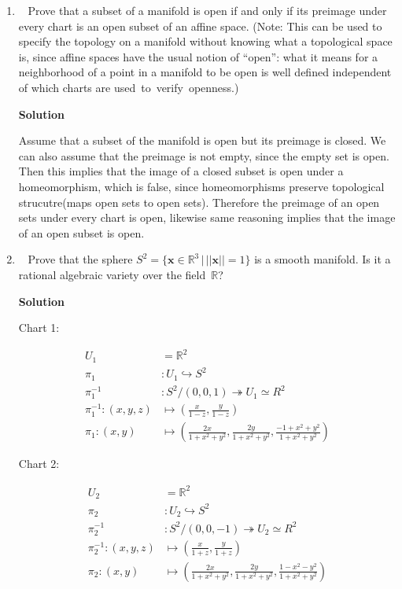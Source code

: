 \documentclass[11pt]{article}
\newcommand\score[1]{\marginpar{\vspace{-2ex}\color{blue}{#1/3}}\hspace{-1ex}}
\newcommand\0{\mathbf{0}}
\newcommand\RR{\mathbb{R}}
\newcommand\xx{\mathbf{x}}
\newcommand\<{\langle}
\renewcommand\>{\rangle}
\begin{document}
\begin{enumerate}

\item\ \score{}%
Prove that a subset of a manifold is open if and only if its preimage
under every chart is an open subset of an affine space.  (Note: This
can be used to specify the topology on a manifold without
knowing what a topological space is, since affine spaces have the
usual
notion of ``open'': what it means for a neighborhood of a point in a
manifold to be open is well defined independent of which charts are
used~to~verify~openness.)

\textbf{Solution}

Assume that a subset of the manifold is open but its preimage
is closed. We can also assume that the preimage is not empty, since the 
empty set is open. Then this implies that the image of a closed subset is open
under a homeomorphism, which is false, since homeomorphisms preserve topological strucutre(maps open sets to open sets).
Therefore the preimage of an open sets under every chart is open, likewise same reasoning implies
that the image of an open subset is open.
\item\ \score{}%
Prove that the sphere $S^2 = \big\{\xx \in \RR^3 \,\big|\, ||\xx|| =
1\big\}$ is a smooth manifold.  Is it a rational algebraic variety
over the field~$\RR$?

\textbf{Solution}

Chart 1:

\begin{align*}
  U_{1}&= \RR^2\\
  \pi_{1}&: U_{1} \hookrightarrow S^2\\
  \pi_{1}^{-1}&: S^2/{(0,0,1)} \twoheadrightarrow U_{1} \simeq R^2 \\
  \pi_{1}^{-1} : (x,y,z)&\mapsto (\frac{x}{1-z},\frac{y}{1-z})\\
  \pi_{1} : (x,y)&\mapsto (\frac{2x}{1+x^2+y^2},\frac{2y}{1+x^2+y^2},\frac{-1+x^2+y^2}{1+x^2+y^2})
\end{align*}

Chart 2:

\begin{align*}
  U_{2}&= \RR^2\\
  \pi_{2}&: U_{2} \hookrightarrow S^2\\
  \pi_{2}^{-1}&: S^2/{(0,0,-1)} \twoheadrightarrow U_{2} \simeq R^2 \\
  \pi_{2}^{-1} : (x,y,z)&\mapsto (\frac{x}{1+z},\frac{y}{1+z})\\
  \pi_{2} : (x,y)&\mapsto (\frac{2x}{1+x^2+y^2},\frac{2y}{1+x^2+y^2},\frac{1-x^2-y^2}{1+x^2+y^2})                
\end{align*}


\end{enumerate}
\end{document}
